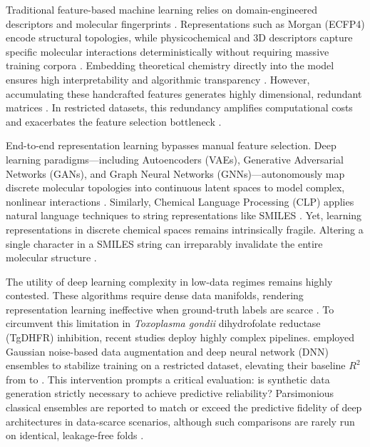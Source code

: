Traditional feature-based machine learning relies on domain-engineered descriptors and molecular fingerprints \cite{rajesh2026}. Representations such as Morgan (ECFP4) encode structural topologies, while physicochemical and 3D descriptors capture specific molecular interactions deterministically without requiring massive training corpora \cite{avantika2025, beatrice2026, xiewt2023}. Embedding theoretical chemistry directly into the model ensures high interpretability and algorithmic transparency \cite{xiewt2023}. However, accumulating these handcrafted features generates highly dimensional, redundant matrices \cite{godarzi2013, hadas2023}. In restricted datasets, this redundancy amplifies computational costs and exacerbates the feature selection bottleneck \cite{godarzi2013, hadas2023}.

End-to-end representation learning bypasses manual feature selection. Deep learning paradigms—including Autoencoders (VAEs), Generative Adversarial Networks (GANs), and Graph Neural Networks (GNNs)—autonomously map discrete molecular topologies into continuous latent spaces to model complex, nonlinear interactions \cite{abul2026, rajesh2026, yifan2023}. Similarly, Chemical Language Processing (CLP) applies natural language techniques to string representations like SMILES \cite{riza2025}. Yet, learning representations in discrete chemical spaces remains intrinsically fragile. Altering a single character in a SMILES string can irreparably invalidate the entire molecular structure \cite{yifan2023}.

The utility of deep learning complexity in low-data regimes remains highly contested. These algorithms require dense data manifolds, rendering representation learning ineffective when ground-truth labels are scarce \cite{sotirios2025}. To circumvent this limitation in \textit{Toxoplasma gondii} dihydrofolate reductase (TgDHFR) inhibition, recent studies deploy highly complex pipelines. \cite{karimova2025} employed Gaussian noise-based data augmentation and deep neural network (DNN) ensembles to stabilize training on a restricted dataset, elevating their baseline $R^2$ from \PaperBaselineRTwo{} to \PaperFinalRTwo{}. This intervention prompts a critical evaluation: is synthetic data generation strictly necessary to achieve predictive reliability? Parsimonious classical ensembles are reported to match or exceed the predictive fidelity of deep architectures in data-scarce scenarios, although such comparisons are rarely run on identical, leakage-free folds \cite{beatrice2026, hadas2023, rajesh2026, salman2023, samuel2023, xiewt2023}.

